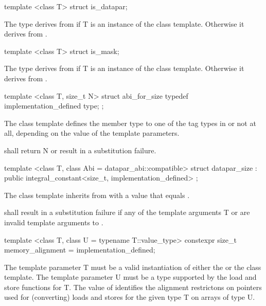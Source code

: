 \begin{itemdecl}
template <class T> struct is_datapar;
\end{itemdecl}
\begin{itemdescr}
  \pnum The  type derives from  if \type T is an instance of the \datapar class template.
  Otherwise it derives from .
\end{itemdescr}

\begin{itemdecl}
template <class T> struct is_mask;
\end{itemdecl}
\begin{itemdescr}
  \pnum The  type derives from  if \type T is an instance of the \mask class template.
  Otherwise it derives from .
\end{itemdescr}

\begin{itemdecl}
template <class T, size_t N> struct abi_for_size { typedef implementation_defined type; };
\end{itemdecl}
\begin{itemdescr}
  \pnum
  The  class template defines the member type  to one of the tag types in  or not at all, depending on the value of the template parameters.

  \pnum
   shall return \code N or result in a substitution failure.
\end{itemdescr}

\begin{itemdecl}
template <class T, class Abi = datapar_abi::compatible>
struct datapar_size : public integral_constant<size_t, implementation_defined> {};
\end{itemdecl}
\begin{itemdescr}
  \pnum The  class template inherits from  with a value that equals \datapar{}.

  \pnum {} shall result in a substitution failure if any of the template arguments \type T or  are invalid template arguments to \datapar.
\end{itemdescr}

\begin{itemdecl}
template <class T, class U = typename T::value_type>
constexpr size_t memory_alignment = implementation_defined;
\end{itemdecl}
\begin{itemdescr}
  \pnum\requires The template parameter \type T must be a valid instantiation of either the \datapar or the \mask class template.
  \pnum\requires The template parameter \type U must be a type supported by the load and store functions for \type T.
  \pnum The value of  identifies the alignment restrictons on pointers used for (converting) loads and stores for the given type \type T on arrays of type \type U.
\end{itemdescr}
